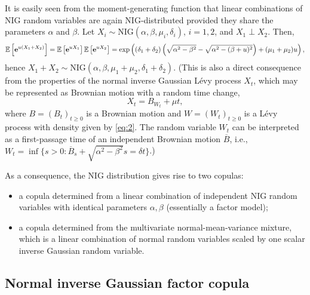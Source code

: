 It is easily seen from the moment-generating function that linear
combinations of NIG random variables are again NIG-distributed
provided they share the parameters $\alpha$ and $\beta$. Let $X_i\sim
\text{NIG}(\alpha, \beta, \mu_i, \delta_i)$, $i=1,2$, and $X_1\perp 
X_2$. Then, 
\begin{equation*}
  {\mathbb{E}}\left[{\bf e}^{u(X_1+X_2)}\right] = {\mathbb{E}}\left[{\bf e}^{u X_1}\right]
  {\mathbb{E}}\left[{\bf e}^{u X_2}\right] = \exp\left((\delta_1+\delta_2)
    \left(\sqrt{\alpha^2-\beta^2} - \sqrt{\alpha^2 -
        (\beta+u)^2}\right) + (\mu_1+\mu_2) u\right),
\end{equation*}
hence $X_1+X_2\sim \text{NIG}(\alpha, \beta, \mu_1+\mu_2,
\delta_1+\delta_2)$. (This is also a direct consequence from the
properties of 
the normal inverse Gaussian L\'evy process $X_t$, which may be
represented as Brownian motion with a random time change,
\begin{equation*}
  X_t = B_{W_t} + \mu t,
\end{equation*}
where $B=(B_t)_{t\geq 0}$ is a Brownian motion and $W=(W_t)_{t\geq 0}$
is a L\'evy process with density given by \eqref{eq:2}. The random
variable $W_t$ can be interpreted as a first-passage time of an
independent Brownian motion $\overline B$, i.e., $W_t=\inf\{s>0:
\overline B_s + \sqrt{\alpha^2-\beta^2}s = \delta t\}$.)

As a consequence, the NIG distribution gives rise to two copulas:
\begin{itemize}
\item a copula determined from a linear combination of independent NIG
  random variables with identical parameters $\alpha, \beta$
  (essentially a factor model);
\item a copula determined from the multivariate normal-mean-variance
  mixture, which is a linear combination of normal random variables
  scaled by one scalar inverse Gaussian random variable.
\end{itemize}

\subsection{Normal inverse Gaussian factor copula}
\label{sec:norm-inverse-gauss}

